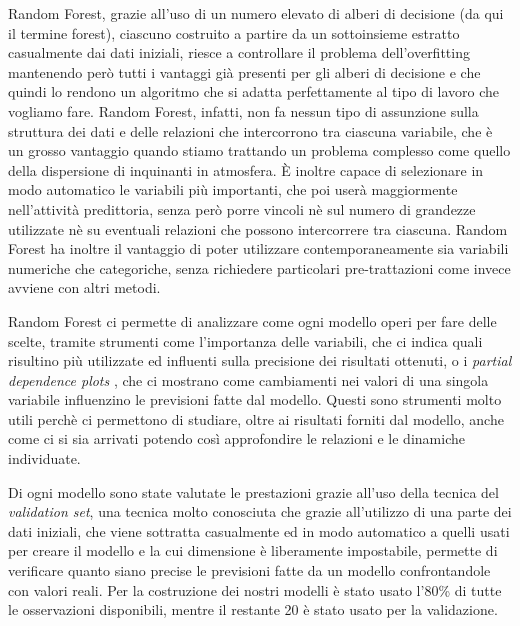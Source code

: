 \documentclass[a4paper]{report}
\begin{document}
Random Forest, grazie all'uso di un numero elevato di alberi di decisione (da qui il termine forest), ciascuno costruito a partire da un sottoinsieme estratto casualmente dai dati iniziali, riesce a controllare il problema dell'overfitting mantenendo però tutti i vantaggi già presenti per gli alberi di decisione e che quindi lo rendono un algoritmo che si adatta perfettamente al tipo di lavoro che vogliamo fare. Random Forest, infatti, non fa nessun tipo di assunzione sulla struttura dei dati e delle relazioni che intercorrono tra ciascuna variabile, che è un grosso vantaggio quando stiamo trattando un problema complesso come quello della dispersione di inquinanti in atmosfera. È inoltre capace di selezionare in modo automatico le variabili più importanti, che poi userà maggiormente nell'attività predittoria, senza però porre vincoli nè sul numero di grandezze utilizzate nè su eventuali relazioni che possono intercorrere tra ciascuna. Random Forest ha inoltre il vantaggio di poter utilizzare contemporaneamente sia variabili numeriche che categoriche, senza richiedere particolari pre-trattazioni come invece avviene con altri metodi. 

Random Forest ci permette di analizzare come ogni modello operi per fare delle scelte, tramite strumenti come l'importanza delle variabili, che ci indica quali risultino più utilizzate ed influenti sulla precisione dei risultati ottenuti, o i \textit{partial dependence plots}
, che ci mostrano come cambiamenti nei valori di una singola variabile influenzino le previsioni fatte dal modello. Questi sono strumenti molto utili perchè ci permettono di studiare, oltre ai risultati forniti dal modello, anche come ci si sia arrivati potendo così approfondire le relazioni e le dinamiche individuate.

Di ogni modello sono state valutate le prestazioni grazie all'uso della tecnica del \textit{validation set}, una tecnica molto conosciuta che grazie all'utilizzo di una parte dei dati iniziali, che viene sottratta casualmente ed in modo automatico a quelli usati per creare il modello e la cui dimensione è liberamente impostabile, permette di verificare quanto siano precise le previsioni fatte da un modello confrontandole con valori reali. Per la costruzione dei nostri modelli è stato usato l'80\% di tutte le osservazioni disponibili, mentre il restante 20 è stato usato per la validazione.
\end{document}
